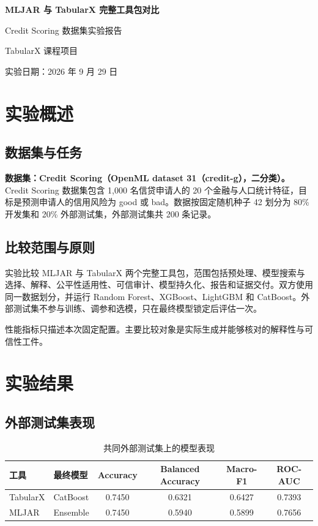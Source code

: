\documentclass[degree=bachelor,language=chinese,fontset=fandol]{thuthesis}
\begin{document}
\begin{titlepage}
  \centering
  \vspace*{2.3cm}
  {\bfseries MLJAR 与 TabularX 完整工具包对比\par}
  \vspace{1.2cm}
  {Credit Scoring 数据集实验报告\par}
  \vspace{2.2cm}
  {TabularX 课程项目\par}
  \vfill
  {实验日期：2026 年 9 月 29 日\par}
  \vspace{1.2cm}
\end{titlepage}

\frontmatter
\tableofcontents
\mainmatter
\chapter{实验概述}
\section{数据集与任务}
\textbf{数据集：Credit Scoring（OpenML dataset 31（credit-g），二分类）。}
Credit Scoring 数据集包含 1,000 名信贷申请人的 20 个金融与人口统计特征，目标是预测申请人的信用风险为 good 或 bad。数据按固定随机种子 42 划分为 80\% 开发集和 20\% 外部测试集，外部测试集共 200 条记录。

\section{比较范围与原则}
实验比较 MLJAR 与 TabularX 两个完整工具包，范围包括预处理、模型搜索与选择、解释、公平性适用性、可信审计、模型持久化、报告和证据交付。双方使用同一数据划分，并运行 Random Forest、XGBoost、LightGBM 和 CatBoost。外部测试集不参与训练、调参和选模，只在最终模型锁定后评估一次。

性能指标只描述本次固定配置。主要比较对象是实际生成并能够核对的解释性与可信性工件。

\chapter{实验结果}
\section{外部测试集表现}
\begin{table}[htbp]
  \centering
  \small
  \caption{共同外部测试集上的模型表现}
  \begin{tabular}{llcccc}
    \toprule
    工具 & 最终模型 & Accuracy & Balanced Accuracy & Macro-F1 & ROC-AUC \\
    \midrule
    TabularX & CatBoost & 0.7450 & 0.6321 & 0.6427 & 0.7393 \\
    MLJAR & Ensemble & 0.7450 & 0.5940 & 0.5899 & 0.7656 \\
    \bottomrule
  \end{tabular}
\end{table}
\end{document}
